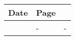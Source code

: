 \chapter*{}
\vspace{-1.5cm}
    \begin{minipage}[r]{.95\textwidth}\raggedleft
    \HUGE\bfseries\ErrataName
    \end{minipage}

\vspace{2.5cm}

\noindent
\lipsum[1]
\vspace{.5cm}
\begin{longtable}{p{4cm}p{1.45cm}p{8cm}}
	Date & Page&   \\\hline
\Date	& -	& -\\
\end{longtable}